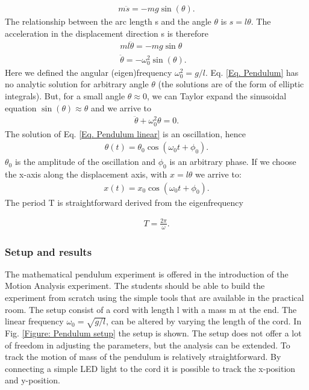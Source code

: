\documentclass{article}
\begin{document}
\begin{align}
    m\ddot{s} = -mg\sin(\theta).
\end{align}
The relationship between the arc length s and the angle $\theta$ is $s=l\theta$. The acceleration in the displacement direction s is therefore
\begin{align}
    ml\ddot{\theta} = -mg\sin{\theta} & \\
    \ddot{\theta} = -\omega_0^2\sin(\theta).
    \label{Eq. Pendulum}
\end{align}
Here we defined the angular (eigen)frequency $\omega_0^2 = g/l$. Eq. \ref{Eq. Pendulum} has no analytic solution for arbitrary angle $\theta$ (the solutions are of the form of elliptic integrals). But, for a small angle $\theta \approx 0$, we can Taylor expand the sinusoidal equation $\sin(\theta)\approx \theta$ and we arrive to 
\begin{align}
    \ddot{\theta} + \omega_0^2 \theta = 0.
    \label{Eq. Pendulum linear}
\end{align}
The solution of Eq. \ref{Eq. Pendulum linear} is an oscillation, hence 
\begin{align}
    \theta(t) = \theta_0\cos(\omega_0 t + \phi_0).
\end{align}
$\theta_0$ is the amplitude of the oscillation and $\phi_0$ is an arbitrary phase. 
If we choose the x-axis along the displacement axis, with $x = l\theta$ we arrive to:
\begin{align}
    x(t) = x_0\cos(\omega_0 t + \phi_0).
\end{align}
The period T is straightforward derived from the eigenfrequency

\begin{align}
    T=\frac{2\pi}{\omega}.
\end{align}

\subsubsection{Setup and results}
The mathematical pendulum experiment is offered in the introduction of the Motion Analysis experiment. The students should be able to build the experiment from scratch using the simple tools that are available in the practical room. The setup consist of a cord with length l with a mass m at the end. The linear frequency $\omega_0 = \sqrt{g/l}$, can be altered by varying the length of the cord. In Fig. \ref{Figure: Pendulum setup} the setup is shown. The setup does not offer a lot of freedom in adjusting the parameters, but the analysis can be extended. To track the motion of mass of the pendulum is relatively straightforward. By connecting a simple LED light to the cord it is possible to track the x-position and y-position. 
\end{document}
